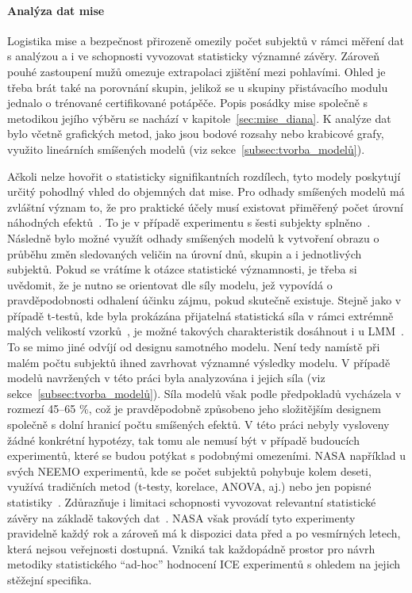 \paragraph{Analýza dat mise}
Logistika mise a bezpečnost přirozeně omezily počet subjektů v rámci měření dat
s analýzou a i ve schopnosti vyvozovat statisticky významné závěry. Zároveň
pouhé zastoupení mužů omezuje extrapolaci zjištění mezi pohlavími. Ohled je
třeba brát také na porovnání skupin, jelikož se u skupiny přistávacího modulu
jednalo o trénované certifikované potápěče. Popis posádky mise společně s
metodikou jejího výběru se nachází v kapitole~\ref{sec:mise_diana}. K analýze
dat bylo včetně grafických metod, jako jsou bodové rozsahy nebo krabicové grafy,
využito lineárních smíšených modelů (viz sekce~\ref{subsec:tvorba_modelů}).

Ačkoli nelze hovořit o statisticky signifikantních rozdílech, tyto modely
poskytují určitý pohodlný vhled do objemných dat mise. Pro odhady smíšených
modelů má zvláštní význam to, že pro praktické účely musí existovat přiměřený
počet úrovní náhodných efektů~\cite{Clark2015}. To je v případě experimentu s
šesti subjekty splněno~\cite{Gomes2022}. Následně bylo možné využít odhady
smíšených modelů k vytvoření obrazu o průběhu změn sledovaných veličin na úrovní
dnů, skupin a i jednotlivých subjektů. Pokud se vrátíme k otázce statistické
významnosti, je třeba si uvědomit, že je nutno se orientovat dle síly modelu,
jež vypovídá o pravděpodobnosti odhalení účinku zájmu, pokud skutečně existuje.
Stejně jako v případě t-testů, kde byla prokázána přijatelná statistická síla v
rámci extrémně malých velikostí vzorků~\cite{Winter2013}, je možné takových
charakteristik dosáhnout i u \gls{LMM}~\cite{Muth2016}. To se mimo jiné odvíjí
od designu samotného modelu. Není tedy namístě při malém počtu subjektů ihned
zavrhovat významné výsledky modelu. V případě modelů navržených v této práci
byla analyzována i jejich síla (viz sekce~\ref{subsec:tvorba_modelů}). Síla
modelů však podle předpokladů vycházela v rozmezí 45--65 \%, což je
pravděpodobně způsobeno jeho složitějším designem společně s dolní hranicí počtu
smíšených efektů. V této práci nebyly vysloveny žádné konkrétní hypotézy, tak
tomu ale nemusí být v případě budoucích experimentů, které se budou potýkat s
podobnými omezeními. \gls{NASA} například u svých \gls{NEEMO} experimentů, kde
se počet subjektů pohybuje kolem deseti, využívá tradičních metod (t-testy,
korelace, ANOVA, aj.) nebo jen popisné
statistiky~\cite{koutnik2021neemo,Chappell2013}. Zdůrazňuje i limitaci
schopnosti vyvozovat relevantní statistické závěry na základě takových
dat~\cite{koutnik2021neemo}. \gls{NASA} však provádí tyto experimenty pravidelně
každý rok a zároveň má k dispozici data před a po vesmírných letech, která
nejsou veřejnosti dostupná. Vzniká tak každopádně prostor pro návrh metodiky
statistického \enquote{ad-hoc} hodnocení \gls{ICE} experimentů s ohledem na
jejich stěžejní specifika.

